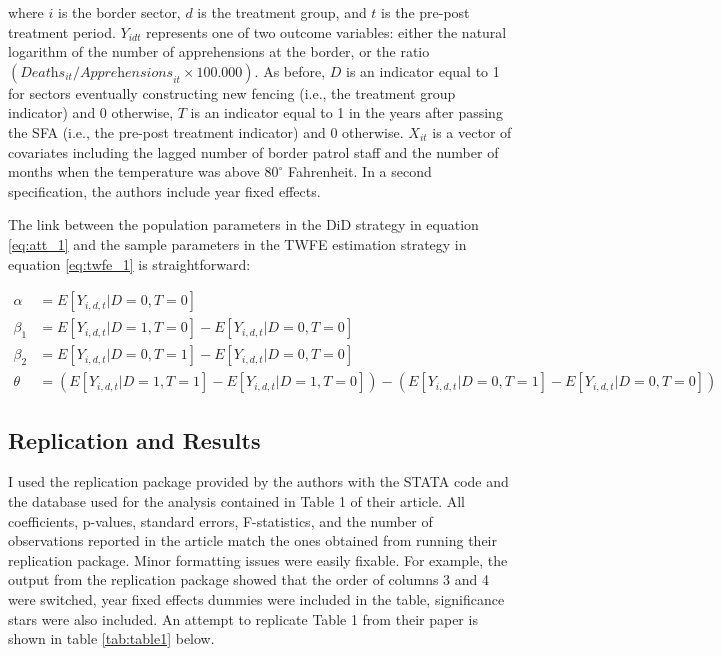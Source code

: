\documentclass[titlepage]{article}
\theoremstyle{plain}
\theoremstyle{plain}
\begin{document}
\noindent where $i$ is the border sector, $d$ is the treatment group, and $t$ is the pre-post treatment period. $Y_{idt}$ represents one of two outcome variables: either the natural logarithm of the number of apprehensions at the border, or the ratio $(\textit{Deaths}_{it}/\textit{Apprehensions}_{it} \times 100.000)$. As before, $D$ is an indicator equal to 1 for sectors eventually constructing new fencing (i.e., the treatment group indicator) and 0 otherwise, $T$ is an indicator equal to 1 in the years after passing the SFA (i.e., the pre-post treatment indicator) and 0 otherwise. $X_{it}$ is a vector of covariates including the lagged number of border patrol staff and the number of months when the temperature was above $80^{\circ}$ Fahrenheit. In a second specification, the authors include year fixed effects.

The link between the population parameters in the DiD strategy in equation \ref{eq:att_1} and the sample parameters in the TWFE estimation strategy in equation \ref{eq:twfe_1} is straightforward:

\begin{align}
\label{eq:parameters_1}
	\alpha &= E[Y_{i,d,t}|D=0,T=0]\\
	\beta_{1} &= E[Y_{i,d,t}|D=1,T=0] - E[Y_{i,d,t}|D=0,T=0]\\
	\beta_{2} &= E[Y_{i,d,t}|D=0,T=1] - E[Y_{i,d,t}|D=0,T=0]\\
	\theta &= (E[Y_{i,d,t}|D=1,T=1]-E[Y_{i,d,t}|D=1,T=0])-(E[Y_{i,d,t}|D=0,T=1]-E[Y_{i,d,t}|D=0,T=0])
\end{align}


\subsection*{Replication and Results}

I used the replication package provided by the authors with the STATA code and the database used for the analysis contained in Table 1 of their article. All coefficients, p-values, standard errors, F-statistics, and the number of observations reported in the article match the ones obtained from running their replication package. Minor formatting issues were easily fixable. For example, the output from the replication package showed that the order of columns 3 and 4 were switched, year fixed effects dummies were included in the table, significance stars were also included. An attempt to replicate Table 1 from their paper is shown in table \ref{tab:table1} below.
\end{document}
